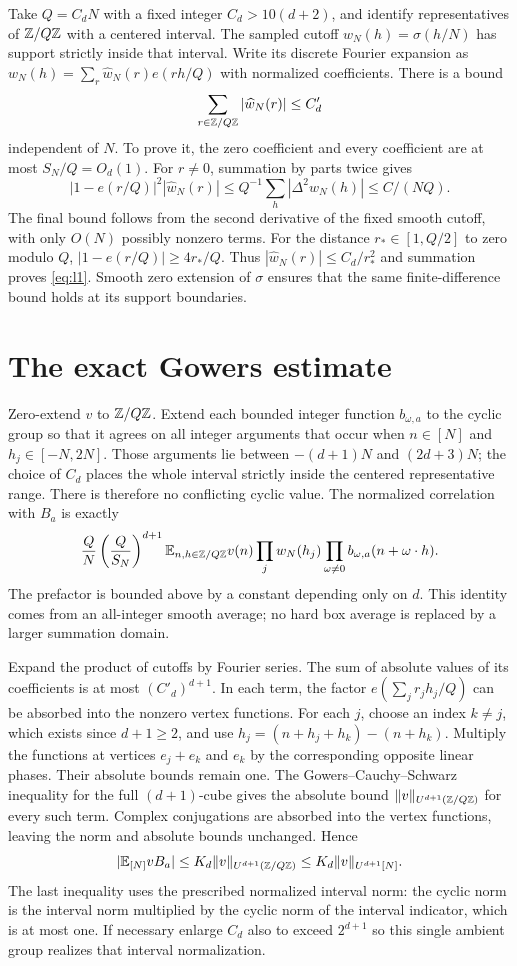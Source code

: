 \documentclass[11pt]{article}
\begin{document}
Take $Q=C_dN$ with a fixed integer $C_d>10(d+2)$, and identify
representatives of $\mathbb Z/Q\mathbb Z$ with a centered interval. The sampled
cutoff $w_N(h)=\sigma(h/N)$ has support strictly inside that interval.
Write its discrete Fourier expansion as
$w_N(h)=\sum_r\widehat w_N(r)e(rh/Q)$ with normalized coefficients.
There is a bound
\begin{equation}\label{eq:l1}
 \sum_{r\in\mathbb Z/Q\mathbb Z}|\widehat w_N(r)|\leq C'_d
\end{equation}
independent of $N$. To prove it, the zero coefficient and every
coefficient are at most $S_N/Q=O_d(1)$. For $r\ne0$, summation by
parts twice gives
\[
 |1-e(r/Q)|^2 |\widehat w_N(r)|
 \leq Q^{-1}\sum_h|\Delta^2w_N(h)|\leq C/(NQ).
\]
The final bound follows from the second derivative of the fixed smooth
cutoff, with only $O(N)$ possibly nonzero terms. For the distance
$r_*\in[1,Q/2]$ to zero modulo $Q$,
$|1-e(r/Q)|\geq4r_*/Q$. Thus
$|\widehat w_N(r)|\leq C_d/r_*^2$ and summation proves
\eqref{eq:l1}. Smooth zero extension of $\sigma$ ensures that the
same finite-difference bound holds at its support boundaries.

\section{The exact Gowers estimate}

Zero-extend $v$ to $\mathbb Z/Q\mathbb Z$. Extend each bounded integer function
$b_{\omega,a}$ to the cyclic group so that it agrees on all integer
arguments that occur when $n\in[N]$ and $h_j\in[-N,2N]$.
Those arguments lie between $-(d+1)N$ and $(2d+3)N$; the choice
of $C_d$ places the whole interval strictly inside the centered
representative range. There is therefore no conflicting cyclic value.
The normalized correlation with $B_a$ is exactly
\[
 \frac{Q}{N}\left(\frac{Q}{S_N}\right)^{d+1}
 \mathbb E_{n,h\in\mathbb Z/Q\mathbb Z}
 v(n)\prod_j w_N(h_j)
          \prod_{\omega\ne0}b_{\omega,a}(n+\omega\cdot h).
\]
The prefactor is bounded above by a constant depending only on $d$.
This identity comes from an all-integer smooth average; no hard box
average is replaced by a larger summation domain.

Expand the product of cutoffs by Fourier series. The sum of absolute
values of its coefficients is at most $(C'_d)^{d+1}$. In each term,
the factor $e(\sum_jr_jh_j/Q)$ can be absorbed into the nonzero
vertex functions. For each $j$, choose an index $k\ne j$, which
exists since $d+1\geq2$, and use
$h_j=(n+h_j+h_k)-(n+h_k)$. Multiply the functions at vertices
$e_j+e_k$ and $e_k$ by the corresponding opposite linear phases.
Their absolute bounds remain one. The Gowers--Cauchy--Schwarz
inequality for the full $(d+1)$-cube gives the absolute bound
$\|v\|_{U^{d+1}(\mathbb Z/Q\mathbb Z)}$ for every such term. Complex
conjugations are absorbed into the vertex functions, leaving the
norm and absolute bounds unchanged. Hence
\[
 |\mathbb E_{[N]}v B_a|\leq K_d\|v\|_{U^{d+1}(\mathbb Z/Q\mathbb Z)}
 \leq K_d\|v\|_{U^{d+1}[N]}.
\]
The last inequality uses the prescribed normalized interval norm:
the cyclic norm is the interval norm multiplied by the cyclic norm
of the interval indicator, which is at most one. If necessary enlarge
$C_d$ also to exceed $2^{d+1}$ so this single ambient group realizes
that interval normalization.
\end{document}
